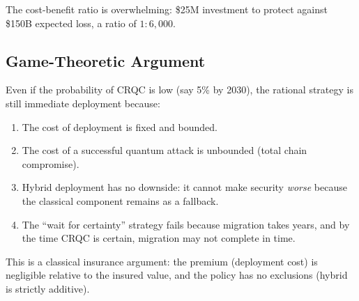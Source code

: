 The cost-benefit ratio is overwhelming: \$25M investment to protect against \$150B
expected loss, a ratio of $1:6{,}000$.

\subsection{Game-Theoretic Argument}

Even if the probability of CRQC is low (say 5\% by 2030), the rational strategy is
still immediate deployment because:

\begin{enumerate}[leftmargin=2em]
  \item The cost of deployment is fixed and bounded.
  \item The cost of a successful quantum attack is unbounded (total chain compromise).
  \item Hybrid deployment has no downside: it cannot make security \emph{worse} because
        the classical component remains as a fallback.
  \item The ``wait for certainty'' strategy fails because migration takes years, and
        by the time CRQC is certain, migration may not complete in time.
\end{enumerate}

This is a classical insurance argument: the premium (deployment cost) is negligible
relative to the insured value, and the policy has no exclusions (hybrid is strictly
additive).


